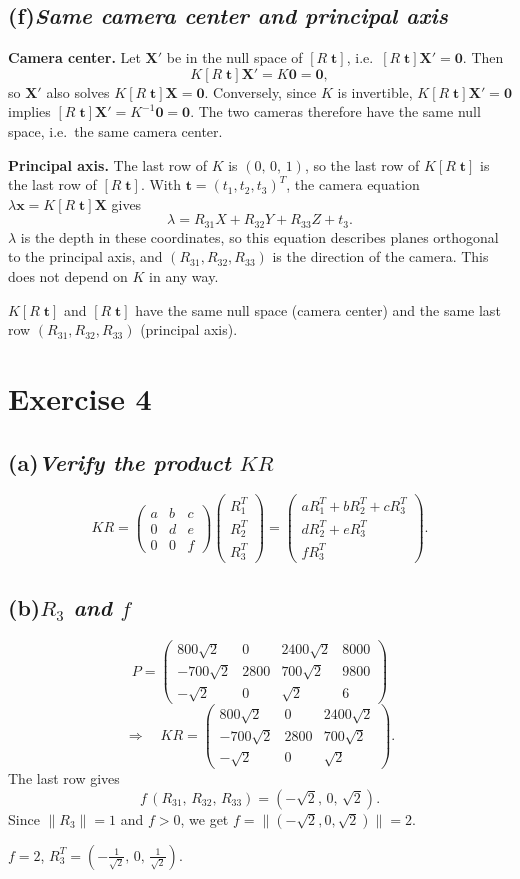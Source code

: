 \documentclass[11pt,a4paper]{article}
\newcommand{\vb}[1]{\mathbf{#1}}
\newcommand{\vect}[1]{
    \begin{pmatrix}#1
\end{pmatrix}}
\newcommand{\exercise}[1]{
\section*{Exercise #1}}
\newcommand{\task}[2]{
\subsection*{#1\quad\normalfont\textit{#2}}}
\begin{document}
\task{(f)}{Same camera center and principal axis}

\textbf{Camera center.} Let $\vb{X}'$ be in the null space of
$[R\;\vb{t}]$, i.e.\ $[R\;\vb{t}]\vb{X}' = \vb{0}$. Then
\[
    K[R\;\vb{t}]\vb{X}' = K\vb{0} = \vb{0},
\]
so $\vb{X}'$ also solves $K[R\;\vb{t}]\vb{X} = \vb{0}$. Conversely,
since $K$ is invertible,
$K[R\;\vb{t}]\vb{X}' = \vb{0}$ implies $[R\;\vb{t}]\vb{X}' =
K^{-1}\vb{0} = \vb{0}$.
The two cameras therefore have the same null space, i.e.\ the same
camera center.

\textbf{Principal axis.} The last row of $K$ is $(0,\,0,\,1)$, so the
last row of
$K[R\;\vb{t}]$ is the last row of $[R\;\vb{t}]$. With $\vb{t} =
(t_1,t_2,t_3)^T$, the camera equation
$\lambda\vb{x} = K[R\;\vb{t}]\vb{X}$ gives
\[
    \lambda = R_{31}X + R_{32}Y + R_{33}Z + t_3 .
\]
$\lambda$ is the depth in these coordinates, so this equation
describes planes orthogonal to the
principal axis, and $(R_{31}, R_{32}, R_{33})$ is the direction of
the camera. This does not depend
on $K$ in any way.
\begin{answer}
    $K[R\;\vb{t}]$ and $[R\;\vb{t}]$ have the same null space (camera
    center) and the same last row
    $(R_{31}, R_{32}, R_{33})$ (principal axis).
\end{answer}

\exercise{4}

\task{(a)}{Verify the product $KR$}

\[
    KR = \vect{a&b&c\\0&d&e\\0&0&f}\vect{R_1^T\\R_2^T\\R_3^T}
    = \vect{aR_1^T + bR_2^T + cR_3^T\\ dR_2^T + eR_3^T\\ fR_3^T}.
\]

\task{(b)}{$R_3$ and $f$}

\[
    P =
    \vect{800\sqrt2&0&2400\sqrt2&8000\\-700\sqrt2&2800&700\sqrt2&9800\\-\sqrt2&0&\sqrt2&6}
\]
\[
    \Longrightarrow\quad
    KR =
    \vect{800\sqrt2&0&2400\sqrt2\\-700\sqrt2&2800&700\sqrt2\\-\sqrt2&0&\sqrt2}.
\]
The last row gives
\[
    f\,(R_{31},\,R_{32},\,R_{33}) = (-\sqrt2,\,0,\,\sqrt2).
\]
Since $\|R_3\| = 1$ and $f > 0$, we get $f = \|(-\sqrt2, 0, \sqrt2)\| = 2$.
\begin{answer}
    $f = 2$, \quad $R_3^T =
    \left(-\tfrac{1}{\sqrt2},\,0,\,\tfrac{1}{\sqrt2}\right)$.
\end{answer}
\end{document}
